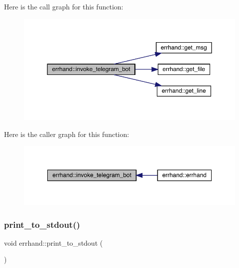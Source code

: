 Here is the call graph for this function\+:\nopagebreak
\begin{figure}[H]
\begin{center}
\leavevmode
\includegraphics[width=350pt]{classerrhand_adbc86e81b391a68d2bf9a13529c977d3_cgraph}
\end{center}
\end{figure}
Here is the caller graph for this function\+:\nopagebreak
\begin{figure}[H]
\begin{center}
\leavevmode
\includegraphics[width=350pt]{classerrhand_adbc86e81b391a68d2bf9a13529c977d3_icgraph}
\end{center}
\end{figure}
\mbox{\label{classerrhand_a5b4d8a74f1d0c6842526dc8b54e38dc2}} 
\subsubsection{\texorpdfstring{print\+\_\+to\+\_\+stdout()}{print\_to\_stdout()}}
{\footnotesize\ttfamily void errhand\+::print\+\_\+to\+\_\+stdout (\begin{DoxyParamCaption}{ }\end{DoxyParamCaption})\hspace{0.3cm}{\ttfamily [inline]}}

